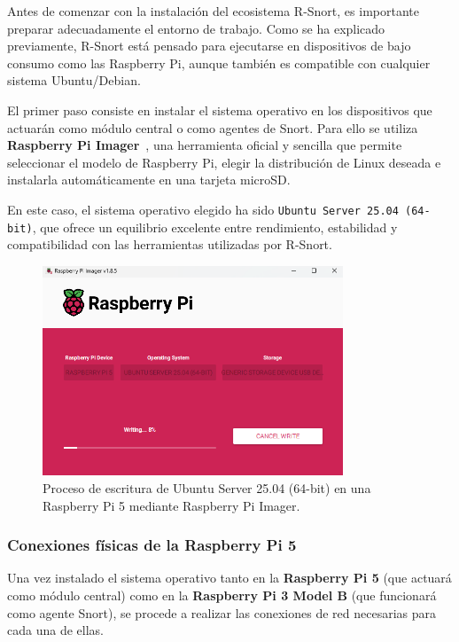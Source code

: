 \documentclass[11pt,a4paper,twoside]{report}
\begin{document}
Antes de comenzar con la instalación del ecosistema R-Snort, es importante preparar adecuadamente el entorno de trabajo. Como se ha explicado previamente, R-Snort está pensado para ejecutarse en dispositivos de bajo consumo como las Raspberry Pi, aunque también es compatible con cualquier sistema Ubuntu/Debian.\newline

El primer paso consiste en instalar el sistema operativo en los dispositivos que actuarán como módulo central o como agentes de Snort. Para ello se utiliza \textbf{Raspberry Pi Imager}~\cite{raspberrypi_software}, una herramienta oficial y sencilla que permite seleccionar el modelo de Raspberry Pi, elegir la distribución de Linux deseada e instalarla automáticamente en una tarjeta microSD.\newline

En este caso, el sistema operativo elegido ha sido \texttt{Ubuntu Server 25.04 (64-bit)}, que ofrece un equilibrio excelente entre rendimiento, estabilidad y compatibilidad con las herramientas utilizadas por R-Snort.

\begin{figure}[H]
	\centering
	\includegraphics[width=0.8\textwidth]{install/1.png}
	\caption{Proceso de escritura de Ubuntu Server 25.04 (64-bit) en una Raspberry Pi 5 mediante Raspberry Pi Imager.}
	\label{fig:preparacion-sistema}
\end{figure}

\subsubsection{Conexiones físicas de la Raspberry Pi 5}

Una vez instalado el sistema operativo tanto en la \textbf{Raspberry Pi 5} (que actuará como módulo central) como en la \textbf{Raspberry Pi 3 Model B} (que funcionará como agente Snort), se procede a realizar las conexiones de red necesarias para cada una de ellas.\newline
\end{document}
